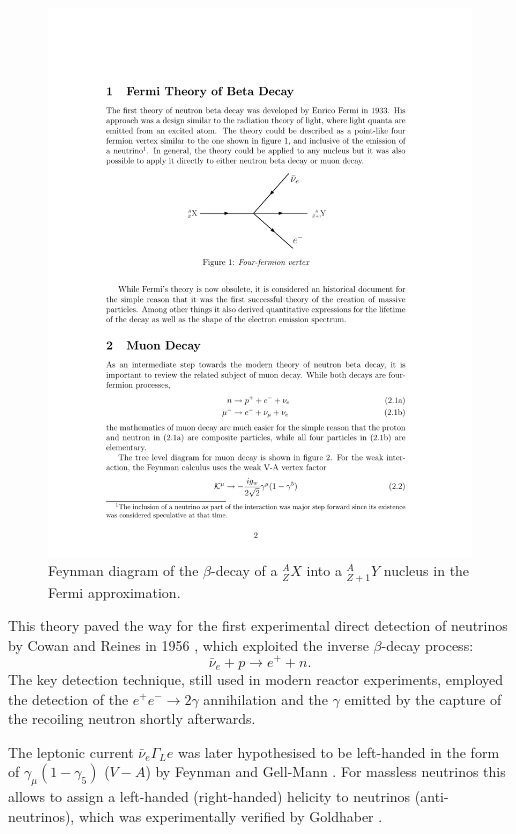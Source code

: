 \begin{figure}
    \centering
    \includegraphics[width=0.7\linewidth]{figures/fermidecay.pdf}
    \caption{Feynman diagram of the $\beta$-decay of a $^{A}_{Z}X$ into a $^{A}_{Z+1}Y$ nucleus in the Fermi approximation.}
    \label{fig:fermibeta}
\end{figure}

This theory paved the way for the first experimental direct detection of neutrinos by Cowan and Reines in 1956 \cite{Cowan:1992xc}, which exploited the inverse $\beta$-decay process:
\begin{equation}
    \bar{\nu}_{e} + p \rightarrow e^{+} + n.
\end{equation}
The key detection technique, still used in modern reactor experiments, employed the detection of the $e^{+}e^{-}\rightarrow 2\gamma$ annihilation and the $\gamma$ emitted by the capture of the recoiling neutron shortly afterwards. 

The leptonic current $\bar{\nu}_{e}\Gamma_{L}e$ was later hypothesised to be left-handed in the form of $\gamma_{\mu}(1-\gamma_{5})$ ($V-A$) by Feynman and Gell-Mann \cite{Feynman:1958ty}.
For massless neutrinos this allows to assign a left-handed (right-handed) helicity to neutrinos (anti-neutrinos), which was experimentally verified by Goldhaber \cite{Goldhaber:1958nb}.

